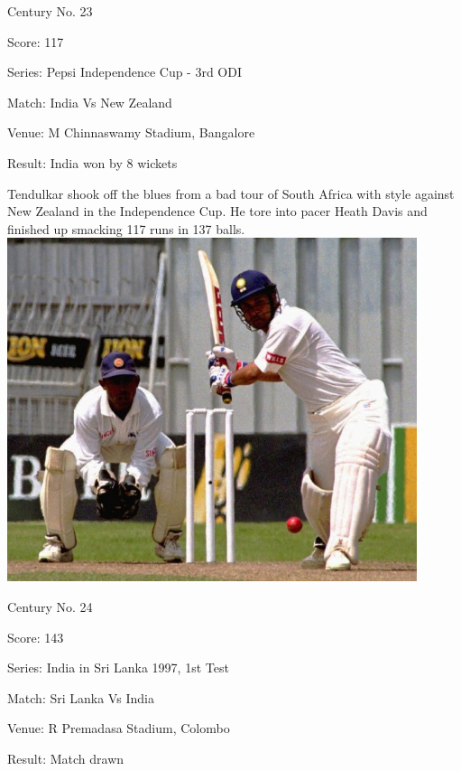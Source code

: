\documentclass[11pt, a4paper]{article}
\begin{document}
Century No. 23

Score: 117

Series: Pepsi Independence Cup - 3rd ODI

Match: India Vs New Zealand

Venue: M Chinnaswamy Stadium, Bangalore

Result: India won by 8 wickets

Tendulkar shook off the blues from a bad tour of South Africa with style against New Zealand in the Independence Cup. He tore into pacer Heath Davis and finished up smacking 117 runs in 137 balls.
\newpage
\includegraphics[width=0.9\textwidth]{pics/24.jpg}

Century No. 24

Score: 143

Series: India in Sri Lanka 1997, 1st Test

Match: Sri Lanka Vs India

Venue: R Premadasa Stadium, Colombo

Result: Match drawn
\end{document}
